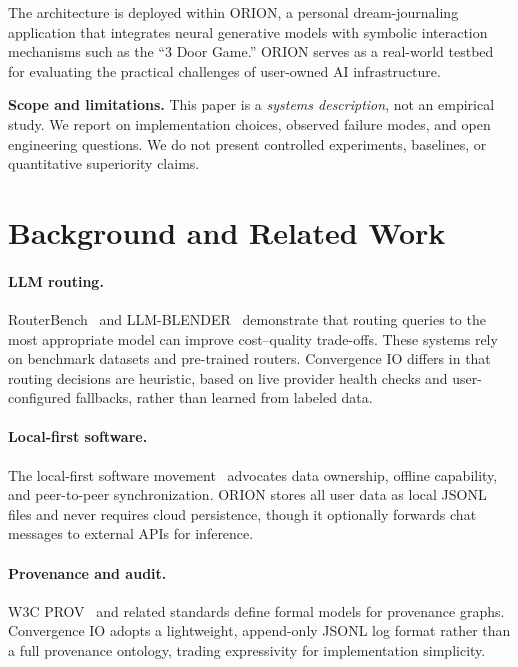 \documentclass{article}
\begin{document}
The architecture is deployed within ORION, a personal dream-journaling
application that integrates neural generative models with symbolic interaction
mechanisms such as the ``3 Door Game.'' ORION serves as a real-world testbed
for evaluating the practical challenges of user-owned AI infrastructure.

\textbf{Scope and limitations.} This paper is a \emph{systems description}, not
an empirical study. We report on implementation choices, observed failure
modes, and open engineering questions. We do not present controlled experiments,
baselines, or quantitative superiority claims.

\section{Background and Related Work}

\paragraph{LLM routing.} RouterBench~\cite{} and LLM-BLENDER~\cite{}
demonstrate that routing queries to the most appropriate model can improve
cost--quality trade-offs. These systems rely on benchmark datasets and
pre-trained routers. Convergence IO differs in that routing decisions are
heuristic, based on live provider health checks and user-configured fallbacks,
rather than learned from labeled data.

\paragraph{Local-first software.} The local-first software movement~\cite{}
advocates data ownership, offline capability, and peer-to-peer
synchronization. ORION stores all user data as local JSONL files and never
requires cloud persistence, though it optionally forwards chat messages to
external APIs for inference.

\paragraph{Provenance and audit.} W3C PROV~\cite{} and related standards
define formal models for provenance graphs. Convergence IO adopts a lightweight,
append-only JSONL log format rather than a full provenance ontology, trading
expressivity for implementation simplicity.
\end{document}
